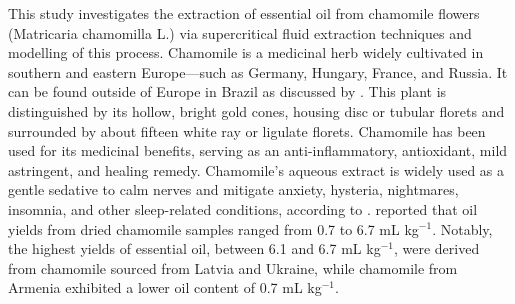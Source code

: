 \documentclass[../Article_Model_Parameters.tex]{subfiles}
\begin{document}
	
	This study investigates the extraction of essential oil from chamomile flowers (Matricaria chamomilla L.) via supercritical fluid extraction techniques and modelling of this process. Chamomile is a medicinal herb widely cultivated in southern and eastern Europe—such as Germany, Hungary, France, and Russia. It can be found outside of Europe in Brazil as discussed by \citet{Singh2011}. This plant is distinguished by its hollow, bright gold cones, housing disc or tubular florets and surrounded by about fifteen white ray or ligulate florets. Chamomile has been used for its medicinal benefits, serving as an anti-inflammatory, antioxidant, mild astringent, and healing remedy. Chamomile's aqueous extract is widely used as a gentle sedative to calm nerves and mitigate anxiety, hysteria, nightmares, insomnia, and other sleep-related conditions, according to \citet{Srivastava2009}. \citet{Orav2010} reported that oil yields from dried chamomile samples ranged from 0.7 to 6.7 mL kg$^{-1}$. Notably, the highest yields of essential oil, between 6.1 and 6.7 mL kg$^{-1}$, were derived from chamomile sourced from Latvia and Ukraine, while chamomile from Armenia exhibited a lower oil content of 0.7 mL kg$^{-1}$.
	
	
	
\end{document}
